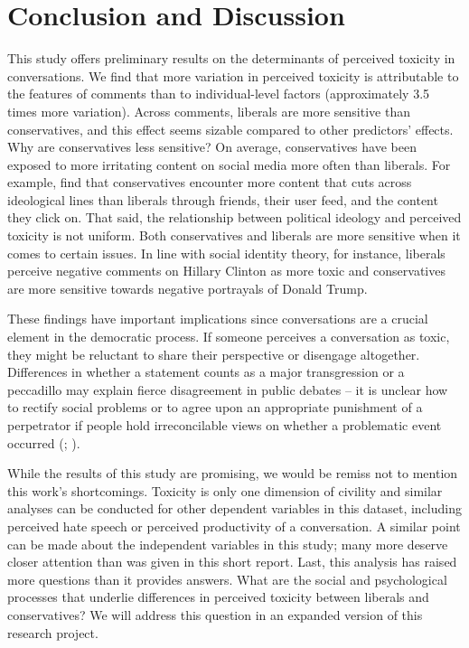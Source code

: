 \documentclass{article}
\begin{document}
\section{Conclusion and Discussion}

This study offers preliminary results on the determinants of perceived toxicity in conversations. We find that more variation in perceived toxicity is attributable to the features of comments than to individual-level factors (approximately 3.5 times more variation). Across comments, liberals are more sensitive than conservatives, and this effect seems sizable compared to other predictors' effects. Why are conservatives less sensitive? On average, conservatives have been exposed to more irritating content on social media more often than liberals. For example, \citet{bakshy_exposure_2015} find that conservatives encounter more content that cuts across ideological lines than liberals through friends, their user feed, and the content they click on. That said, the relationship between political ideology and perceived toxicity is not uniform. Both conservatives and liberals are more sensitive when it comes to certain issues. In line with social identity theory, for instance, liberals perceive negative comments on Hillary Clinton as more toxic and conservatives are more sensitive towards negative portrayals of Donald Trump.

These findings have important implications since conversations are a crucial element in the democratic process. If someone perceives a conversation as toxic, they might be reluctant to share their perspective or disengage altogether. Differences in whether a statement counts as a major transgression or a peccadillo may explain fierce disagreement in public debates -- it is unclear how to rectify social problems or to agree upon an appropriate punishment of a perpetrator if people hold irreconcilable views on whether a problematic event occurred (\citealp{hastorf_game_1954}; \citealp{haslam_harm_2020}).

While the results of this study are promising, we would be remiss not to mention this work's shortcomings. Toxicity is only one dimension of civility and similar analyses can be conducted for other dependent variables in this dataset, including perceived hate speech or perceived productivity of a conversation. A similar point can be made about the independent variables in this study; many more deserve closer attention than was given in this short report. Last, this analysis has raised more questions than it provides answers. What are the social and psychological processes that underlie differences in perceived toxicity between liberals and conservatives? We will address this question in an expanded version of this research project. 
\end{document}
